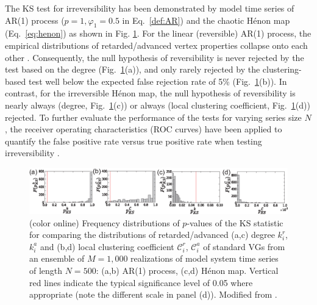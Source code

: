 		The KS test for irreversibility has been demonstrated by model time series of AR(1) process ($p = 1, \varphi_1 = 0.5$ in Eq.~\eqref{def:AR}) and the chaotic H\'enon map (Eq.~\eqref{eq:henon}) as shown in Fig. \ref{fig:chapter4KSReverse}. For the linear (reversible) AR(1) process, the empirical distributions of retarded/advanced {vertex properties} collapse onto each other \cite{Donges2013}. Consequently, the null hypothesis of reversibility is never rejected by the test based on the degree (Fig.~\ref{fig:chapter4KSReverse}(a)), and only rarely rejected by the clustering-based test well below the expected false rejection rate of 5\% (Fig.~\ref{fig:chapter4KSReverse}(b)). In contrast, for the irreversible H\'enon map, the null hypothesis of reversibility is nearly always (degree, Fig.~\ref{fig:chapter4KSReverse}(c)) or always (local clustering coefficient, Fig.~\ref{fig:chapter4KSReverse}(d)) rejected. To further evaluate the performance of the tests for varying series size $N$, the receiver operating characteristics (ROC curves) have been applied to quantify the false positive rate versus true positive rate when testing irreversibility \cite{Donges2013}. 		
		\begin{figure}[htbp]
		\centering
			\includegraphics[width=\columnwidth]{Chapter04_VisibilityGt/ks_reverse.eps}
			\caption{(color online) Frequency distributions of $p$-values of the KS statistic for comparing the distributions of retarded/advanced (a,c) degree {$k_i^{r}$, $k_i^{a}$} and (b,d) local clustering coefficient {$\mathcal{C}^{r}_i$, $\mathcal{C}^{a}_i$} of standard VGs from an ensemble of $M=1,000$ realizations of model system time series of length $N=500$: (a,b) AR(1) process, (c,d) H\'enon map. Vertical red lines indicate the typical significance level of 0.05 {where appropriate (note the different scale in panel (d))}.  Modified from \cite{Donges2013}. } \label{fig:chapter4KSReverse}
		\end{figure}

